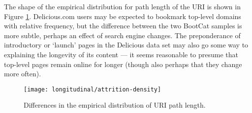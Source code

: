 The shape of the empirical distribution for path length of the URI is shown in Figure \ref{fig:longitudinal:attrition:attrition-density}.  Delicious.com users may be expected to bookmark top-level domains with relative frequency, but the difference between the two BootCat samples is more subtle, perhaps an effect of search engine changes.  The preponderance of introductory or `launch' pages in the Delicious data set may also go some way to explaining the longevity of its content --- it seems reasonable to presume that top-level pages remain online for longer (though also perhaps that they change more often).


\begin{figure}[Ht]
    \centering
    \texttt{[image: longitudinal/attrition-density]}
    \caption{Differences in the empirical distribution of URI path length.}
    \label{fig:longitudinal:attrition:attrition-density}
\end{figure}


